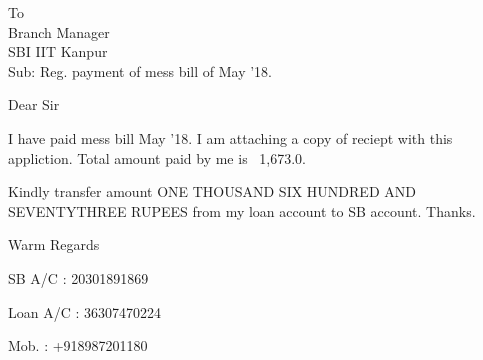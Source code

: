 \documentclass{letter}
\date{July 5, 2018}
\begin{document}
\begin{letter}{To \\ Branch Manager \\ SBI IIT Kanpur \\ Sub: Reg. payment of mess bill of May '18.}
\opening{Dear Sir}
I have paid mess bill May '18. I am attaching a copy of reciept with this appliction. Total amount paid by me is \rupee~1,673.0. \par 
Kindly transfer amount ONE THOUSAND SIX HUNDRED AND SEVENTYTHREE RUPEES from my loan account to SB account. Thanks.
\closing{Warm Regards}
SB A/C : 20301891869\par 
Loan A/C : 36307470224\par 
Mob. : +918987201180

\end{letter}
\end{document}

